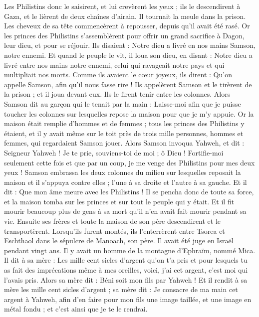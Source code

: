 \begin{multicols}{2}
Les Philistins donc le saisirent, et lui crevèrent les yeux ; ils le descendirent à Gaza, et le lièrent de deux chaînes d'airain. Il tournait la meule dans la prison.
Les cheveux de sa tête commencèrent à repousser, depuis qu'il avait été rasé.
Or les princes des Philistins s'assemblèrent pour offrir un grand sacrifice à Dagon, leur dieu, et pour se réjouir. Ils disaient : Notre dieu a livré en nos mains Samson, notre ennemi.
Et quand le peuple le vit, il loua son dieu, en disant : Notre dieu a livré entre nos mains notre ennemi, celui qui ravageait notre pays et qui multipliait nos morts.
Comme ils avaient le cœur joyeux, ils dirent : Qu'on appelle Samson, afin qu'il nous fasse rire ! Ils appelèrent Samson et le tirèrent de la prison ; et il joua devant eux. Ils le firent tenir entre les colonnes.
Alors Samson dit au garçon qui le tenait par la main : Laisse-moi afin que je puisse toucher les colonnes sur lesquelles repose la maison pour que je m'y appuie.
Or la maison était remplie d'hommes et de femmes ; tous les princes des Philistins y étaient, et il y avait même sur le toit près de trois mille personnes, hommes et femmes, qui regardaient Samson jouer.
Alors Samson invoqua Yahweh, et dit : Seigneur Yahweh ! Je te prie, souviens-toi de moi ; ô Dieu ! Fortifie-moi seulement cette fois et que par un coup, je me venge des Philistins pour mes deux yeux !
Samson embrassa les deux colonnes du milieu sur lesquelles reposait la maison et il s'appuya contre elles ; l'une à sa droite et l'autre à sa gauche.
Et il dit : Que mon âme meure avec les Philistins ! Il se pencha donc de toute sa force, et la maison tomba sur les princes et sur tout le peuple qui y était. Et il fit mourir beaucoup plus de gens à sa mort qu'il n'en avait fait mourir pendant sa vie.
Ensuite ses frères et toute la maison de son père descendirent et le transportèrent. Lorsqu'ils furent montés, ils l'enterrèrent entre Tsorea et Eschthaol dans le sépulcre de Manoach, son père. Il avait été juge en Israël pendant vingt ans.
\VerseOne{}Il y avait un homme de la montagne d'Ephraïm, nommé Mica.
Il dit à sa mère : Les mille cent sicles d'argent qu'on t'a pris et pour lesquels tu as fait des imprécations même à mes oreilles, voici, j'ai cet argent, c'est moi qui l'avais pris. Alors sa mère dit : Béni soit mon fils par Yahweh !
Et il rendit à sa mère les mille cent sicles d'argent ; sa mère dit : Je consacre de ma main cet argent à Yahweh, afin d'en faire pour mon fils une image taillée, et une image en métal fondu ; et c'est ainsi que je te le rendrai.

\end{multicols}
